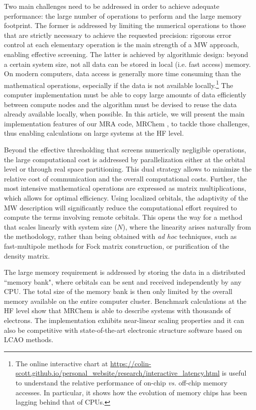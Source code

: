 \documentclass[journal=jctcce, manuscript=article]{achemso}
\begin{document}
Two main challenges need to be addressed in order to achieve adequate performance: the large number of operations to perform and the large memory footprint. The former is addressed by limiting the numerical operations to those that are strictly necessary to achieve the requested precision: rigorous error control at each elementary operation is the main strength of a \ac{MW} approach, enabling effective screening. The latter is achieved by algorithmic design: beyond a certain system size, not all data can be stored in local (i.e. fast access) memory. 
On modern computers, data access is generally more time consuming than the mathematical operations, especially if the data is not available locally.\footnote{The online interactive chart at \url{https://colin-scott.github.io/personal_website/research/interactive_latency.html} is useful to understand the relative performance of on-chip \emph{vs.} off-chip memory accesses. In particular, it shows how the evolution of memory chips has been lagging behind that of CPUs.} 
The computer implementation must be able to copy large amounts of data efficiently between compute nodes and the algorithm must be devised to reuse the data already available locally, when possible. In this article, we will present the main implementation features of our \ac{MRA} code, MRChem \cite{mrchem}, to tackle those challenges, thus enabling calculations on large systems at the \ac{HF} level.

Beyond the effective thresholding that screens numerically negligible operations, the large computational cost is addressed by parallelization either at the orbital level or through real space partitioning. This dual strategy allows to minimize the relative cost of communication and the overall computational costs. Further, the most intensive mathematical operations are expressed as matrix multiplications, which allows for optimal efficiency.  
Using localized orbitals, the adaptivity of the \ac{MW} description will significantly reduce the computational effort required to compute the terms involving remote orbitals. This opens the way for a method that scales linearly with system size ($N$), where the linearity arises naturally from the methodology, rather than being obtained with \emph{ad hoc} techniques, such as fast-multipole methods \cite{GREENGARD1987325} for Fock matrix construction, or purification of the density matrix. \cite{Helgaker2000-yb}

The large memory requirement is addressed by storing the data in a distributed ``memory bank", where orbitals can be sent and received independently by any CPU. The total size of the memory bank is then only limited by the overall memory available on the entire computer cluster.
Benchmark calculations at the \ac{HF} level show that MRChem is able to describe systems with thousands of electrons. The implementation exhibits near-linear scaling properties and it can also be competitive with state-of-the-art electronic structure software based on \ac{LCAO} methods.
\end{document}
